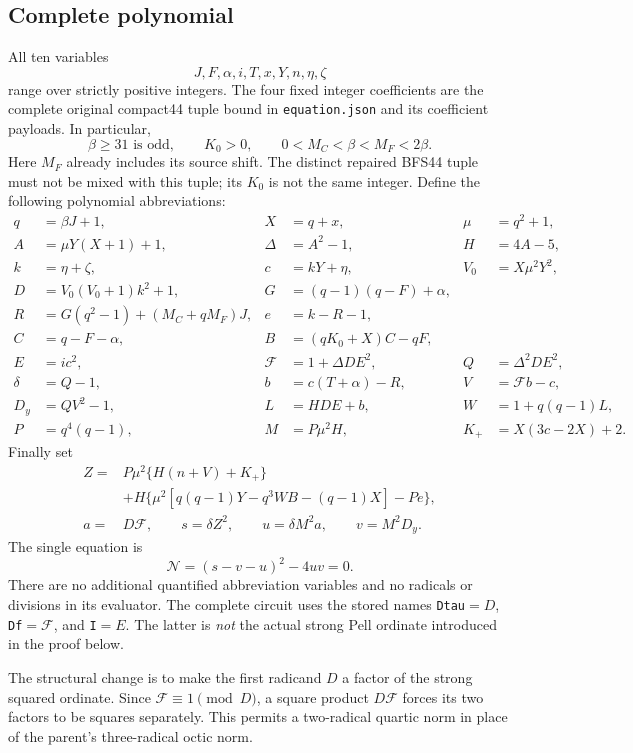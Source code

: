 \subsection{Complete polynomial}
All ten variables
\[
       J,F,\alpha,i,T,x,Y,n,\eta,\zeta
\]
range over strictly positive integers. The four fixed integer coefficients
are the complete original compact44 tuple bound in \texttt{equation.json}
and its coefficient payloads. In particular,
\[
 \beta\ge31\text{ is odd},\qquad K_0>0,\qquad
 0<M_C<\beta<M_F<2\beta.
\]
Here $M_F$ already includes its source shift. The distinct repaired BFS44
tuple must not be mixed with this tuple; its $K_0$ is not the same integer.
Define the following polynomial abbreviations:
\begin{align*}
q&=\beta J+1,& X&=q+x,& \mu&=q^2+1,\\
A&=\mu Y(X+1)+1,&\Delta&=A^2-1,&H&=4A-5,\\
k&=\eta+\zeta,&c&=kY+\eta,&V_0&=X\mu^2Y^2,\\
D&=V_0(V_0+1)k^2+1,&G&=(q-1)(q-F)+\alpha,\\
R&=G(q^2-1)+(M_C+qM_F)J,&e&=k-R-1,\\
C&=q-F-\alpha,&B&=(qK_0+X)C-qF,\\
E&=ic^2,&\mathcal F&=1+\Delta DE^2,&Q&=\Delta^2DE^2,\\
\delta&=Q-1,&b&=c(T+\alpha)-R,&V&=\mathcal F b-c,\\
D_y&=QV^2-1,&L&=HDE+b,&W&=1+q(q-1)L,\\
P&=q^4(q-1),&M&=P\mu^2H,&K_+&=X(3c-2X)+2.
\end{align*}
Finally set
\begin{align*}
Z={}&P\mu^2\{H(n+V)+K_+\}\\
 &+H\{\mu^2[q(q-1)Y-q^3WB-(q-1)X]-Pe\},\\
a={}&D\mathcal F,\qquad s=\delta Z^2,\qquad
u=\delta M^2a,\qquad v=M^2D_y.
\end{align*}
The single equation is
\begin{equation}\label{eq:fused-positive}
             \boxed{\mathcal N=(s-v-u)^2-4uv=0.}
\end{equation}
There are no additional quantified abbreviation variables and no radicals
or divisions in its evaluator. The complete circuit uses the stored names
\texttt{Dtau}$=D$, \texttt{Df}$=\mathcal F$, and \texttt{I}$=E$.
The latter is \emph{not} the actual strong Pell ordinate introduced in the
proof below.

The structural change is to make the first radicand $D$ a factor of the
strong squared ordinate. Since $\mathcal F\equiv1\pmod D$, a square
product $D\mathcal F$ forces its two factors to be squares separately.
This permits a two-radical quartic norm in place of the parent's
three-radical octic norm.

